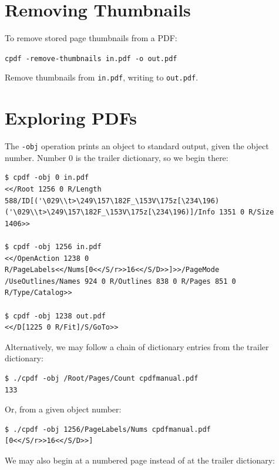 \documentclass{book}
\begin{document}
\section{Removing Thumbnails}

To remove stored page thumbnails from a PDF:

  \begin{framed}
  \small\noindent\verb!cpdf -remove-thumbnails in.pdf -o out.pdf!

  \vspace{2.5mm}
  \noindent Remove thumbnails from \texttt{in.pdf}, writing to \texttt{out.pdf}. 
  \end{framed}


\section{Exploring PDFs}

\noindent The \texttt{-obj} operation prints an object to standard output, given the object number. Number 0 is the trailer dictionary, so we begin there:

{\small\begin{verbatim}
$ cpdf -obj 0 in.pdf
<</Root 1256 0 R/Length 588/ID[('\029\\t>\249\157\182F_\153V\175z[\234\196)
('\029\\t>\249\157\182F_\153V\175z[\234\196)]/Info 1351 0 R/Size 1406>>

$ cpdf -obj 1256 in.pdf
<</OpenAction 1238 0 R/PageLabels<</Nums[0<</S/r>>16<</S/D>>]>>/PageMode
/UseOutlines/Names 924 0 R/Outlines 838 0 R/Pages 851 0 R/Type/Catalog>>

$ cpdf -obj 1238 out.pdf
<</D[1225 0 R/Fit]/S/GoTo>>
\end{verbatim}}

\noindent Alternatively, we may follow a chain of dictionary entries from the trailer dictionary:

{\small\begin{verbatim}
$ ./cpdf -obj /Root/Pages/Count cpdfmanual.pdf
133
\end{verbatim}}

\noindent Or, from a given object number:

{\small\begin{verbatim}
$ ./cpdf -obj 1256/PageLabels/Nums cpdfmanual.pdf
[0<</S/r>>16<</S/D>>]
\end{verbatim}}

\noindent We may also begin at a numbered page instead of at the trailer dictionary:
\end{document}
